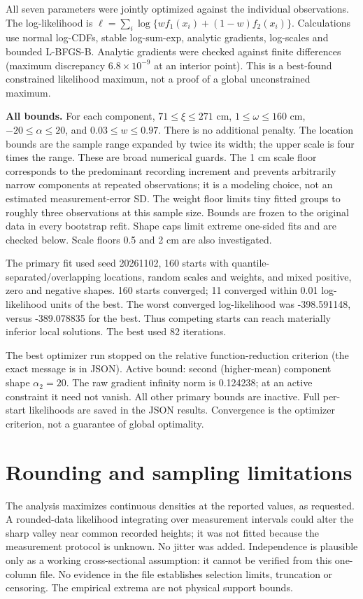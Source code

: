 \documentclass[11pt,a4paper]{article}
\begin{document}
All seven parameters were jointly optimized against the individual observations.
The log-likelihood is $\ell=\sum_i\log\{wf_1(x_i)+(1-w)f_2(x_i)\}$.
Calculations use normal log-CDFs, stable log-sum-exp, analytic gradients,
log-scales and bounded L-BFGS-B. Analytic gradients were checked against
finite differences (maximum discrepancy $6.8\times10^{-9}$ at an interior point).
This is a best-found constrained likelihood maximum, not a proof of a global
unconstrained maximum.

\textbf{All bounds.} For each component, $71\leq\xi\leq271$ cm,
$1\leq\omega\leq160$ cm, $-20\leq\alpha\leq20$, and
$0.03\leq w\leq0.97$. There is no additional penalty. The location bounds are
the sample range expanded by twice its width; the upper scale is four times
the range. These are broad numerical guards. The 1 cm scale floor corresponds
to the predominant recording increment and prevents arbitrarily narrow
components at repeated observations; it is a modeling choice, not an estimated
measurement-error SD. The weight floor limits tiny fitted groups to roughly
three observations at this sample size. Bounds are frozen to the original
data in every bootstrap refit. Shape caps limit extreme one-sided fits and
are checked below. Scale floors 0.5 and 2 cm are also investigated.

The primary fit used seed 20261102, 160 starts with quantile-separated/overlapping locations, random scales and weights, and mixed positive, zero and negative shapes. 160 starts converged; 11 converged within 0.01 log-likelihood units of the best. The worst converged log-likelihood was -398.591148, versus -389.078835 for the best. Thus competing starts can reach materially inferior local solutions. The best used 82 iterations.

The best optimizer run stopped on the relative function-reduction criterion (the exact message is in JSON). Active bound: second (higher-mean) component shape $\alpha_2=20$. The raw gradient infinity norm is 0.124238; at an active constraint it need not vanish. All other primary bounds are inactive. Full per-start likelihoods are saved in the JSON results. Convergence is the optimizer criterion, not a guarantee of global optimality.

\section*{Rounding and sampling limitations}
The analysis maximizes continuous densities at the reported values, as requested.
A rounded-data likelihood integrating over measurement intervals could alter
the sharp valley near common recorded heights; it was not fitted because the
measurement protocol is unknown. No jitter was added. Independence is plausible
only as a working cross-sectional assumption: it cannot be verified from
this one-column file. No evidence in the file establishes selection limits,
truncation or censoring. The empirical extrema are not physical support bounds.
\end{document}
